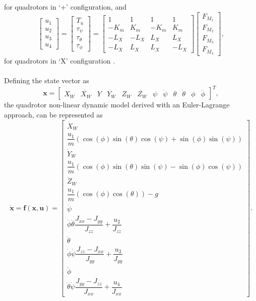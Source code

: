 for quadrotors in `+' configuration, and
\begin{equation}
\begin{bmatrix}
u_1 \\[5pt] u_2 \\[5pt] u_3 \\[5pt] u_4
\end{bmatrix}	 = \begin{bmatrix}
	T_u\\[5pt]
	\tau_{\psi}\\[5pt]
	\tau_{\theta}\\[5pt]
	\tau_{\phi}
	\end{bmatrix} = \begin{bmatrix}
	1 & 1 & 1 & 1 \\[5pt]
	-K_{m} & K_{m} & -K_{m} & K_{m}\\[5pt]
	-L_{X} & -L_{X} & L_{X} & L_{X}\\[5pt]
	-L_{X} & L_{X} & L_{X} & -L_{X}
							\end{bmatrix}
\begin{bmatrix}
F_{M_1}\\[5pt]
F_{M_2}\\[5pt]
F_{M_3}\\[5pt]
F_{M_4}
\end{bmatrix},
\end{equation}
for quadrotors in `X' configuration \cite{Emam2016, Badr2016}.
\\\\
Defining the state vector as
\setcounter{MaxMatrixCols}{20}
\begin{equation}
\mathbf{x} = \begin{bmatrix}
X_W & \dot{X_W} & Y & \dot{Y_W} & Z_W & \dot{Z_W} & \psi & \dot{\psi} & \theta & \dot{\theta} & \phi & \dot{\phi}
\end{bmatrix}^{T},
\end{equation} 
the quadrotor non-linear dynamic model derived with an Euler-Lagrange approach, can be represented as
\begin{equation}
\label{eqn:eulerlagrangemodel}
\mathbf{\dot{x}} = \mathbf{f(x,u)} = \begin{bmatrix}
\dot{X}_W \\[5pt]
\dfrac{u_{1}}{m}(\cos(\phi)\sin(\theta)\cos(\psi) + \sin(\phi)\sin(\psi)) \\[5pt]
\dot{Y}_W \\[5pt]
\dfrac{u_{1}}{m}(\cos(\phi)\sin(\theta)\sin(\psi) - \sin(\phi)\cos(\psi)) \\[5pt]
\dot{Z}_W \\[5pt]
\dfrac{u_{1}}{m}(\cos(\phi)\cos(\theta)) - g \\[5pt]
\dot{\psi} \\[5pt]
\dot{\phi}\dot{\theta} \dfrac{J_{xx}-J_{yy}}{J_{zz}} + \dfrac{u_{2}}{J_{zz}} \\[5pt]
\dot{\theta} \\[5pt]
\dot{\phi} \dot{\psi}\dfrac{J_{zz}-J_{xx}}{J_{yy}} + \dfrac{u_{3}}{J_{yy}} \\[5pt]
\dot{\phi} \\[5pt]
\dot{\theta}\dot{\psi}\dfrac{J_{yy}-J_{zz}}{J_{xx}} + \dfrac{u_{4}}{J_{xx}}
\end{bmatrix}.
\end{equation}

